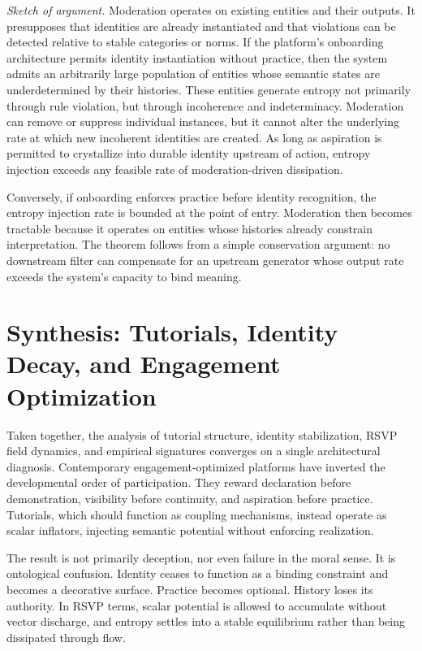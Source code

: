 \documentclass[11pt,oneside]{article}
\begin{document}
\textit{Sketch of argument.} Moderation operates on existing entities and their outputs. It presupposes that identities are already instantiated and that violations can be detected relative to stable categories or norms. If the platform’s onboarding architecture permits identity instantiation without practice, then the system admits an arbitrarily large population of entities whose semantic states are underdetermined by their histories. These entities generate entropy not primarily through rule violation, but through incoherence and indeterminacy. Moderation can remove or suppress individual instances, but it cannot alter the underlying rate at which new incoherent identities are created. As long as aspiration is permitted to crystallize into durable identity upstream of action, entropy injection exceeds any feasible rate of moderation-driven dissipation.

Conversely, if onboarding enforces practice before identity recognition, the entropy injection rate is bounded at the point of entry. Moderation then becomes tractable because it operates on entities whose histories already constrain interpretation. The theorem follows from a simple conservation argument: no downstream filter can compensate for an upstream generator whose output rate exceeds the system’s capacity to bind meaning.

\section{Synthesis: Tutorials, Identity Decay, and Engagement Optimization}

Taken together, the analysis of tutorial structure, identity stabilization, RSVP field dynamics, and empirical signatures converges on a single architectural diagnosis. Contemporary engagement-optimized platforms have inverted the developmental order of participation. They reward declaration before demonstration, visibility before continuity, and aspiration before practice. Tutorials, which should function as coupling mechanisms, instead operate as scalar inflators, injecting semantic potential without enforcing realization.

The result is not primarily deception, nor even failure in the moral sense. It is ontological confusion. Identity ceases to function as a binding constraint and becomes a decorative surface. Practice becomes optional. History loses its authority. In RSVP terms, scalar potential is allowed to accumulate without vector discharge, and entropy settles into a stable equilibrium rather than being dissipated through flow.
\end{document}
